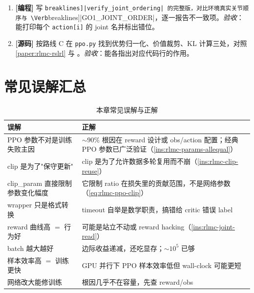 \begin{practice}[部署核对与源码]
\begin{enumerate}
  \item \textbf{[编程]} 写 \Verb[breaklines]|verify_joint_ordering| 的完整版，对比环境真实关节顺序与 \Verb[breaklines]|GO1_JOINT_ORDER|，逐一报告不一致项。\emph{验收}：能打印每个 \verb|action[i]| 的 joint 名并标出错位。
  \item \textbf{[源码]} 按路线 C 在 \verb|ppo.py| 找到优势归一化、价值裁剪、KL 计算三处，对照 \cref{paper:rlmc-rslrl} 与 \cite{huang2022ppo37}。\emph{验收}：能各指出对应代码行的作用。
\end{enumerate}
\end{practice}

\section*{常见误解汇总}
\label{sec:rlmc-train-misconceptions}

\begin{table}[H]
\centering
\caption{本章常见误解与正解}
\label{tab:rlmc-train-misc}
\begin{tabular}{p{6.0cm}p{7.0cm}}
\hline
误解 & 正解 \\
\hline
PPO 参数不对是训练失败主因 & $\sim90\%$ 根因在 reward 设计或 obs/action 配置；经典 PPO 参数已广泛验证（\cref{ins:rlmc-params-allequal}） \\
clip 是为了"保守更新" & clip 是为了允许数据多轮复用而不崩（\cref{ins:rlmc-clip-reuse}） \\
clip\_param 直接限制参数变化幅度 & 它限制 ratio 在损失里的贡献范围，不是网络参数（\cref{eq:rlmc-ppo-clip}） \\
wrapper 只是格式转换 & timeout 自举是数学职责，搞错给 critic 错误 label \\
reward 曲线高 $=$ 行为好 & 可能是站立不动或 reward hacking（\cref{ins:rlmc-joint-read}） \\
batch 越大越好 & 边际收益递减，还吃显存；$\sim10^5$ 已够 \\
样本效率高 $=$ 训练更快 & GPU 并行下 PPO 样本效率低但 wall-clock 可能更短 \\
网络改大能修训练 & 根因几乎不在容量，先查 reward/obs \\
\hline
\end{tabular}
\end{table}

